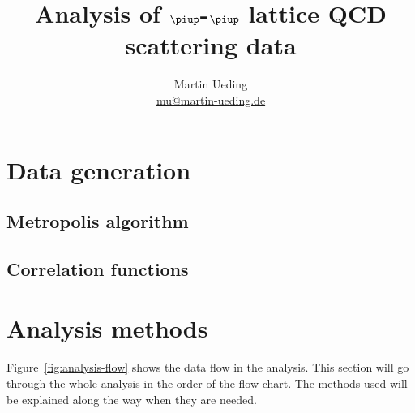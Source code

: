 \documentclass[11pt, english, fleqn, DIV=15, headinclude]{scrartcl}
\title{Analysis of $\piup$-$\piup$ lattice QCD scattering data}
\author{
    Martin Ueding \\ \small{\href{mailto:mu@martin-ueding.de}{mu@martin-ueding.de}}
}
\begin{document}
\maketitle

\begin{abstract}
\end{abstract}

\tableofcontents

\newpage

\section{Data generation}

\subsection{Metropolis algorithm}

\subsection{Correlation functions}

\section{Analysis methods}

Figure~\ref{fig:analysis-flow} shows the data flow in the analysis. This
section will go through the whole analysis in the order of the flow chart. The
methods used will be explained along the way when they are needed.
\end{document}
